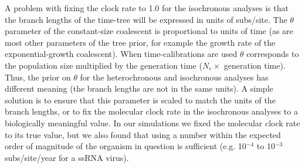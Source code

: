 \documentclass[10pt,letterpaper]{article}
\begin{document}
A problem with fixing the clock rate to 1.0 for the isochronous analyses is that the branch lengths of the time-tree will be expressed in units of subs/site. The $\theta$ parameter of the constant-size coalescent is proportional to units of time \cite{ho2011skyline, drummond2002estimating} (as are most other parameters of the tree prior, for example the growth rate of the exponential-growth coalescent). When time-calibrations are used $\theta$ corresponds to the population size multiplied by the generation time ($N_e \times$ generation time). Thus, the prior on $\theta$ for the heterochronous and isochronous analyses has different meaning (the branch lengths are not in the same units). A simple solution is to ensure that this parameter is scaled to match the units of the branch lengths, or to fix the molecular clock rate in the isochronous analyses to a biologically meaningful value. In our simulations we fixed the molecular clock rate to its true value, but we also found that using a number within the expected order of magnitude of the organism in question is sufficient (e.g. 10$^{-4}$ to 10$^{-3}$ subs/site/year for a ssRNA virus).
\end{document}
